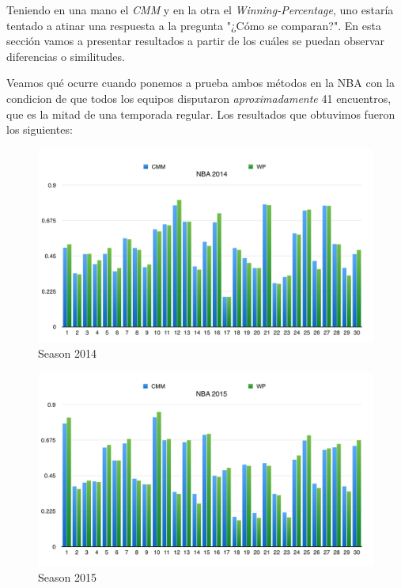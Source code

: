 Teniendo en una mano el \textit{CMM} y en la otra el \textit{Winning-Percentage}, uno estar\'ia tentado a atinar una respuesta a la pregunta "¿C\'omo se comparan?". En esta secci\'on vamos a presentar resultados a partir de los cu\'ales se puedan observar diferencias o similitudes.

Veamos qu\'e ocurre cuando ponemos a prueba ambos m\'etodos en la NBA con la condicion de que todos los equipos disputaron \textit{aproximadamente} 41 encuentros, que es la mitad de una temporada regular. Los resultados que obtuvimos fueron los siguientes: \\

\begin{figure}[h!]
  \begin{center}
	\includegraphics[scale=0.40]{imagenes/cualitative/comparative/nba2014.png}
	\caption{Season 2014}
  \end{center}
\end{figure}

\begin{figure}[h!]
  \begin{center}
	\includegraphics[scale=0.40]{imagenes/cualitative/comparative/nba2015.png}
	\caption{Season 2015}
  \end{center}
\end{figure}
\newpage

